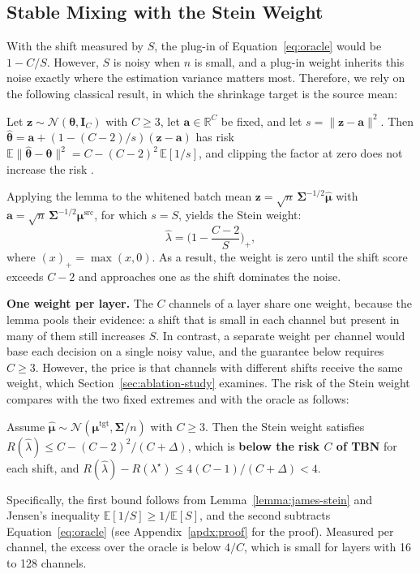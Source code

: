 \subsection{Stable Mixing with the Stein Weight} \label{sec:stein-weight}
With the shift measured by $S$, the plug-in of Equation~\ref{eq:oracle} would be $1 - C/S$.
However, $S$ is noisy when $n$ is small, and a plug-in weight inherits this noise exactly where the estimation variance matters most.
Therefore, we rely on the following classical result, in which the shrinkage target is the source mean:
\begin{lemma}\label{lemma:james-stein}
Let $\mathbf{z} \sim \mathcal{N}(\boldsymbol{\theta}, \mathbf{I}_C)$ with $C \ge 3$, let $\mathbf{a} \in \mathbb{R}^{C}$ be fixed, and let $s = \|\mathbf{z} - \mathbf{a}\|^2$. Then $\hat{\boldsymbol{\theta}} = \mathbf{a} + (1 - (C-2)/s)(\mathbf{z} - \mathbf{a})$ has risk $\mathbb{E}\|\hat{\boldsymbol{\theta}} - \boldsymbol{\theta}\|^2 = C - (C-2)^2\,\mathbb{E}[1/s]$, and clipping the factor at zero does not increase the risk \cite{Efron-Morris}.
\end{lemma}
Applying the lemma to the whitened batch mean $\mathbf{z} = \sqrt{n}\,\boldsymbol{\Sigma}^{-1/2}\hat{\boldsymbol{\mu}}$ with $\mathbf{a} = \sqrt{n}\,\boldsymbol{\Sigma}^{-1/2}\boldsymbol{\mu}^{\text{src}}$, for which $s = S$, yields the Stein weight:
\begin{equation}\label{eq:stein-weight}
\hat{\lambda} = \Big(1 - \frac{C-2}{S}\Big)_{+},
\end{equation}
where $(x)_+ = \max(x, 0)$.
As a result, the weight is zero until the shift score exceeds $C-2$ and approaches one as the shift dominates the noise.

\textbf{One weight per layer.} The $C$ channels of a layer share one weight, because the lemma pools their evidence: a shift that is small in each channel but present in many of them still increases $S$.
In contrast, a separate weight per channel would base each decision on a single noisy value, and the guarantee below requires $C \ge 3$.
However, the price is that channels with different shifts receive the same weight, which Section~\ref{sec:ablation-study} examines.
The risk of the Stein weight compares with the two fixed extremes and with the oracle as follows:
\begin{proposition}\label{prop:risk}
Assume $\hat{\boldsymbol{\mu}} \sim \mathcal{N}(\boldsymbol{\mu}^{\text{tgt}}, \boldsymbol{\Sigma}/n)$ with $C \ge 3$. Then the Stein weight satisfies $R(\hat{\lambda}) \le C - (C-2)^2/(C + \Delta)$, which is \textbf{below the risk $C$ of TBN} for each shift, and $R(\hat{\lambda}) - R(\lambda^{\star}) \le 4(C-1)/(C+\Delta) < 4$.
\end{proposition}
Specifically, the first bound follows from Lemma~\ref{lemma:james-stein} and Jensen's inequality $\mathbb{E}[1/S] \ge 1/\mathbb{E}[S]$, and the second subtracts Equation~\ref{eq:oracle} (see Appendix~\ref{apdx:proof} for the proof).
Measured per channel, the excess over the oracle is below $4/C$, which is small for layers with 16 to 128 channels.

